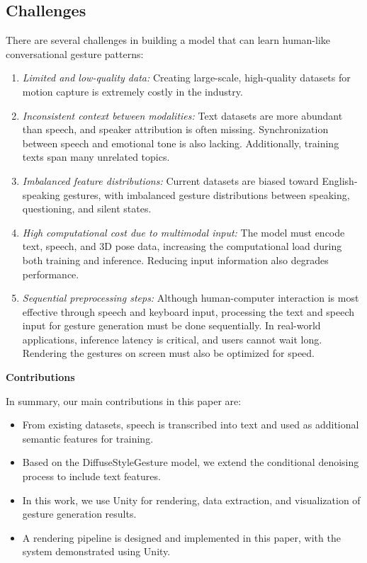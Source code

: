 \subsection{Challenges}
\label{sec:difficult}

There are several challenges in building a model that can learn human-like conversational gesture patterns:

\begin{enumerate}
	\item \textit{Limited and low-quality data:} Creating large-scale, high-quality datasets for motion capture is extremely costly in the industry.
	
	\item \textit{Inconsistent context between modalities:} Text datasets are more abundant than speech, and speaker attribution is often missing. Synchronization between speech and emotional tone is also lacking. Additionally, training texts span many unrelated topics.
	
	\item \textit{Imbalanced feature distributions:} Current datasets are biased toward English-speaking gestures, with imbalanced gesture distributions between speaking, questioning, and silent states.
	
	\item \textit{High computational cost due to multimodal input:} The model must encode text, speech, and 3D pose data, increasing the computational load during both training and inference. Reducing input information also degrades performance.
	
	\item \textit{Sequential preprocessing steps:} Although human-computer interaction is most effective through speech and keyboard input, processing the text and speech input for gesture generation must be done sequentially. In real-world applications, inference latency is critical, and users cannot wait long. Rendering the gestures on screen must also be optimized for speed.
\end{enumerate}

\large \textbf{Contributions}

 In summary, our main contributions in this paper are:
 
\begin{itemize}
	\item From existing datasets, speech is transcribed into text and used as additional semantic features for training.
	
	\item Based on the DiffuseStyleGesture model, we extend the conditional denoising process to include text features.
	
	\item In this work, we use Unity for rendering, data extraction, and visualization of gesture generation results.
	
	\item A rendering pipeline is designed and implemented in this paper, with the system demonstrated using Unity.
\end{itemize}

